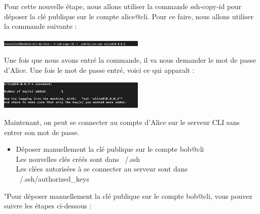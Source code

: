 \documentclass[12pt]{article}
\begin{document}
\vspace{0.3cm}

Pour cette nouvelle étape, nous allons utiliser la commande ssh-copy-id pour déposer la clé publique sur le compte alice@cli. Pour ce faire, nous allons utiliser la commande suivante :

\vspace{0.3cm}

\begin{center}
  \includegraphics[width=7cm]{Images-Client-SSH/Image-TD-SSH-2/ssh-copy-id.png}
\end{center}

\vspace{0.3cm}

Une fois que nous avons entré la commande, il va nous demander le mot de passe d'Alice. Une fois le mot de passe entré, voici ce qui apparaît :

\vspace{0.3cm}

\begin{center}
  \includegraphics[width=7cm]{Images-Client-SSH/Image-TD-SSH-2/key-add.png}
\end{center}

\vspace{0.3cm}

Maintenant, on peut se connecter au compte d'Alice sur le serveur CLI sans entrer son mot de passe.

\vspace{0.3cm}

\begin{itemize}
  \item Déposer manuellement la clé publique sur le compte bob@cli \\
  Les nouvelles clés créés sont dans ~/.ssh\\
  Les clées autorisées à se connecter au serveur sont dans ~/.ssh/authorized\_keys
\end{itemize}

\vspace{0.3cm}

"Pour déposer manuellement la clé publique sur le compte bob@cli, vous pouvez suivre les étapes ci-dessous :
\end{document}
